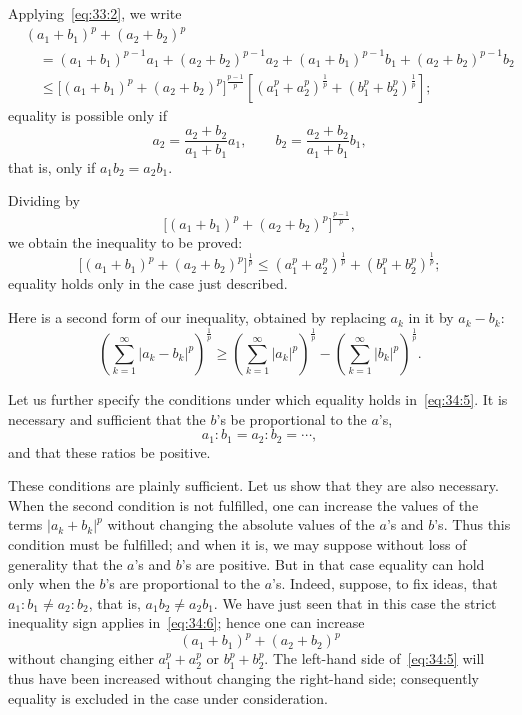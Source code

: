 \documentclass[
  paper=b5,
  fontsize=13pt,
  twoside=true,
  open=any,
  bookmarkpackage=false,
  chapterprefix=true,
  headings=normal
]{scrbook}
\theoremstyle{definition}
\begin{document}
Applying~\eqref{eq:33:2}, we write
\begin{equation}
\begin{aligned}
 &(a_1+b_1)^p+(a_2+b_2)^p\\
 &\quad=(a_1+b_1)^{p-1}a_1+(a_2+b_2)^{p-1}a_2
       +(a_1+b_1)^{p-1}b_1+(a_2+b_2)^{p-1}b_2\\
 &\quad\leq
 \bigl[(a_1+b_1)^p+(a_2+b_2)^p\bigr]^{\frac{p-1}{p}}
 \left[(a_1^p+a_2^p)^{\frac1p}+(b_1^p+b_2^p)^{\frac1p}\right];
\end{aligned}
\tag{6}\label{eq:34:6}
\end{equation}
equality is possible only if
\[
 a_2=\frac{a_2+b_2}{a_1+b_1}a_1,
 \qquad
 b_2=\frac{a_2+b_2}{a_1+b_1}b_1,
\]
that is, only if $a_1b_2=a_2b_1$.

Dividing by
\[
 \bigl[(a_1+b_1)^p+(a_2+b_2)^p\bigr]^{\frac{p-1}{p}},
\]
we obtain the inequality to be proved:
\[
 \bigl[(a_1+b_1)^p+(a_2+b_2)^p\bigr]^{\frac1p}
 \leq(a_1^p+a_2^p)^{\frac1p}+(b_1^p+b_2^p)^{\frac1p};
\]
equality holds only in the case just described.

Here is a second form of our inequality, obtained by replacing $a_k$ in it by $a_k-b_k$:
\begin{equation}
 \left(\sum_{k=1}^{\infty}|a_k-b_k|^p\right)^{\frac1p}
 \geq
 \left(\sum_{k=1}^{\infty}|a_k|^p\right)^{\frac1p}
 -\left(\sum_{k=1}^{\infty}|b_k|^p\right)^{\frac1p}.
 \tag{7}\label{eq:34:7}
\end{equation}

Let us further specify the conditions under which equality holds in~\eqref{eq:34:5}. It is necessary and sufficient that the $b$'s be proportional to the $a$'s,
\[
 a_1:b_1=a_2:b_2=\cdots,
\]
and that these ratios be positive.

These conditions are plainly sufficient. Let us show that they are also necessary. When the second condition is not fulfilled, one can increase the values of the terms $|a_k+b_k|^p$ without changing the absolute values of the $a$'s and $b$'s. Thus this condition must be fulfilled; and when it is, we may suppose without loss of generality that the $a$'s and $b$'s are positive. But in that case equality can hold only when the $b$'s are proportional to the $a$'s. Indeed, suppose, to fix ideas, that $a_1:b_1\ne a_2:b_2$, that is, $a_1b_2\ne a_2b_1$. We have just seen that in this case the strict inequality sign applies in~\eqref{eq:34:6}; hence one can increase
\[
 (a_1+b_1)^p+(a_2+b_2)^p
\]
without changing either $a_1^p+a_2^p$ or $b_1^p+b_2^p$. The left-hand side of~\eqref{eq:34:5} will thus have been increased without changing the right-hand side; consequently equality is excluded in the case under consideration.
\end{document}
